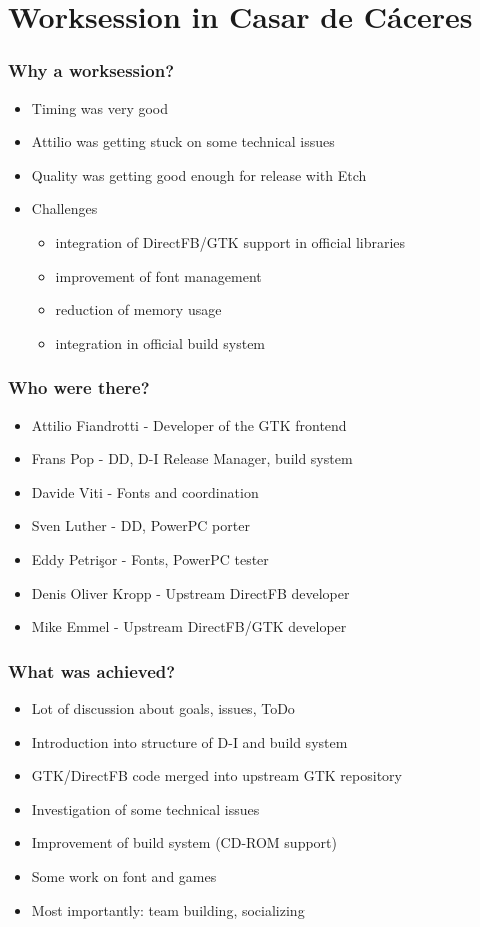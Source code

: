 \documentclass{beamer}
\begin{document}
\section{Worksession in Casar de C\'{a}ceres}

\begin{frame}
  \frametitle{Why a worksession?}
	\begin{itemize}
	\item
		Timing was very good
	\item
		Attilio was getting stuck on some technical issues
	\item
		Quality was getting good enough for release with Etch
	\item
		Challenges
		\begin{itemize}
		\item
			integration of DirectFB/GTK support in official libraries
		\item
			improvement of font management
		\item
			reduction of memory usage
		\item
			integration in official build system
		\end{itemize}
	\end{itemize}
\end{frame}

\begin{frame}
  \frametitle{Who were there?}
	\begin{itemize}
	\item
		Attilio Fiandrotti - Developer of the GTK frontend
	\item
		Frans Pop - DD, D-I Release Manager, build system
	\item
		Davide Viti - Fonts and coordination
	\item
		Sven Luther - DD, PowerPC porter
	\item
		Eddy Petrişor - Fonts, PowerPC tester
	\end{itemize}
	\begin{itemize}
	\item
		Denis Oliver Kropp - Upstream DirectFB developer
	\item
		Mike Emmel - Upstream DirectFB/GTK developer
	\end{itemize}
\end{frame}

\begin{frame}
  \frametitle{What was achieved?}
	\begin{itemize}
	\item
		Lot of discussion about goals, issues, ToDo
	\item
		Introduction into structure of D-I and build system
	\item
		GTK/DirectFB code merged into upstream GTK repository
	\item
		Investigation of some technical issues
	\item
		Improvement of build system (CD-ROM support)
	\item
		Some work on font and games
	\item
		Most importantly: team building, socializing
	\end{itemize}
\end{frame}
\end{document}
